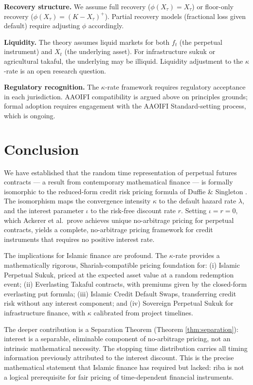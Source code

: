 \documentclass[10pt,twocolumn]{article}
\theoremstyle{plain}
\theoremstyle{definition}
\begin{document}
\textbf{Recovery structure.} We assume full recovery
($\phi(X_\tau) = X_\tau$) or floor-only recovery
($\phi(X_\tau) = (K-X_\tau)^+$). Partial recovery models
(fractional loss given default) require adjusting $\phi$ accordingly.

\textbf{Liquidity.} The theory assumes liquid markets for both
$f_t$ (the perpetual instrument) and $X_t$ (the underlying asset).
For infrastructure sukuk or agricultural takaful, the underlying
may be illiquid. Liquidity adjustment to the $\kappa$-rate is
an open research question.

\textbf{Regulatory recognition.} The $\kappa$-rate framework
requires regulatory acceptance in each jurisdiction. AAOIFI
compatibility is argued above on principles grounds; formal
adoption requires engagement with the AAOIFI Standard-setting
process, which is ongoing.

\section{Conclusion}
\label{sec:conclusion}

We have established that the random time representation of
perpetual futures contracts --- a result from contemporary
mathematical finance \cite{Ackerer2024} --- is formally
isomorphic to the reduced-form credit risk pricing formula of
Duffie \& Singleton \cite{DuffieSingleton1999}. The isomorphism
maps the convergence intensity $\kappa$ to the default hazard
rate $\lambda$, and the interest parameter $\iota$ to the
risk-free discount rate $r$. Setting $\iota = r = 0$, which
Ackerer et al.\ prove achieves unique no-arbitrage pricing for
perpetual contracts, yields a complete, no-arbitrage pricing
framework for credit instruments that requires no positive
interest rate.

The implications for Islamic finance are profound. The $\kappa$-rate
provides a mathematically rigorous, Shariah-compatible pricing
foundation for: (i) Islamic Perpetual Sukuk, priced at the
expected asset value at a random redemption event; (ii) Everlasting
Takaful contracts, with premiums given by the closed-form
everlasting put formula; (iii) Islamic Credit Default Swaps,
transferring credit risk without any interest component; and (iv)
Sovereign Perpetual Sukuk for infrastructure finance, with
$\kappa$ calibrated from project timelines.

The deeper contribution is a Separation Theorem (Theorem
\ref{thm:separation}): interest is a separable, eliminable
component of no-arbitrage pricing, not an intrinsic mathematical
necessity. The stopping time distribution carries all timing
information previously attributed to the interest discount.
This is the precise mathematical statement that Islamic finance
has required but lacked: riba is not a logical prerequisite for
fair pricing of time-dependent financial instruments.
\end{document}
